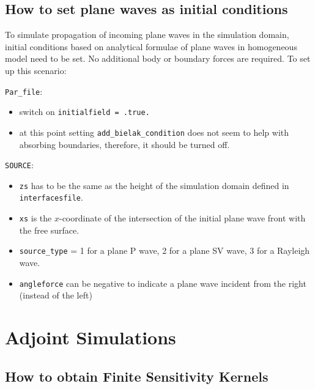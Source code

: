 \documentclass[oneside,english,onecolumn,letterpaper]{book}
\begin{document}
\section{How to set plane waves as initial conditions}
To simulate propagation of incoming plane waves in the simulation domain, initial conditions based on analytical formulae of plane waves in homogeneous model need to be set. No additional body or boundary forces are required. To set up this scenario:
%
\begin{description}
\item{\verb+Par_file+:}
  \begin{itemize}
  \item switch on \verb+initialfield = .true. +
  \item at this point setting \verb+add_bielak_condition+ does not seem to help with absorbing boundaries, therefore, it should be turned off.
  \end{itemize}
\item{\verb+SOURCE+:}
  \begin{itemize}
  \item \verb+zs+ has to be the same as the height of the simulation domain defined in \verb+interfacesfile+.
  \item \verb+xs+ is the $x$-coordinate of the intersection of the initial plane wave front with the free surface.
  \item \verb+source_type+ = 1 for a plane P wave, 2 for a plane SV wave, 3 for a Rayleigh wave.
  \item \verb+angleforce+ can be negative to indicate a plane wave incident from the right (instead of the left)
  \end{itemize}
\end{description}




\chapter{Adjoint Simulations}



\section{How to obtain Finite Sensitivity Kernels}
\end{document}
